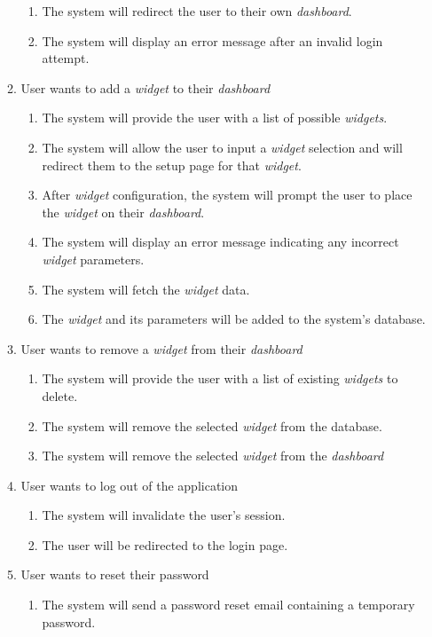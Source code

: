 \documentclass{article}
\begin{document}
\begin{enumerate}[{VP}1]
\begin{enumerate}[{BE}1]
\begin{enumerate}
				\item The system will redirect the user to their own \textit{dashboard}. 
				\item The system will display an error message after an invalid login attempt.
			\end{enumerate}
			\item User wants to add a \textit{widget} to their \textit{dashboard}
			\begin{enumerate}
				\item The system will provide the user with a list of possible \textit{widgets}. 
				\item The system will allow the user to input a \textit{widget} selection and will redirect them to the setup page for that \textit{widget}.
				\item After \textit{widget} configuration, the system will prompt the user to place the \textit{widget} on their \textit{dashboard}.
				\item The system will display an error message indicating any incorrect \textit{widget} parameters.
				\item The system will fetch the \textit{widget} data.
				\item The \textit{widget} and its parameters will be added to the system's database.
			\end{enumerate}
			\item User wants to remove a \textit{widget} from their \textit{dashboard}
			\begin{enumerate}
				\item The system will provide the user with a list of existing \textit{widgets} to delete. 
				\item The system will remove the selected \textit{widget} from the database.
				\item The system will remove the selected \textit{widget} from the \textit{dashboard}
			\end{enumerate}
			\item User wants to log out of the application
			\begin{enumerate}
				\item The system will invalidate the user's session.
				\item The user will be redirected to the login page.
			\end{enumerate}
			\item User wants to reset their password
			\begin{enumerate}
				\item The system will send a password reset email containing a temporary password.

\end{enumerate}
\end{enumerate}
\end{enumerate}
\end{document}
